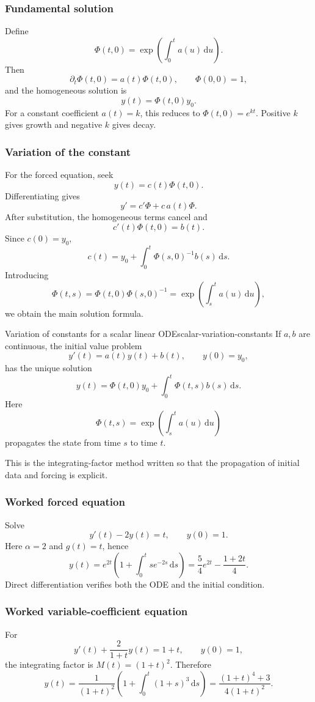 \documentclass[11pt]{article}
\newcommand{\dd}{\,\mathrm{d}}
\theoremstyle{definition}
\theoremstyle{plain}
\theoremstyle{remark}
\begin{document}
\subsubsection*{Fundamental solution}

Define
\[
\boxed{\Phi(t,0)=\exp\left(\int_0^t a(u)\dd u\right).}
\]
Then
\[
\partial_t\Phi(t,0)=a(t)\Phi(t,0),
\qquad \Phi(0,0)=1,
\]
and the homogeneous solution is
\[
\boxed{y(t)=\Phi(t,0)y_0.}
\]
For a constant coefficient $a(t)=k$, this reduces to
$\Phi(t,0)=e^{kt}$. Positive $k$ gives growth and negative $k$ gives decay.

\subsubsection*{Variation of the constant}

For the forced equation, seek
\[
y(t)=c(t)\Phi(t,0).
\]
Differentiating gives
\[
y'=c'\Phi+c\,a(t)\Phi.
\]
After substitution, the homogeneous terms cancel and
\[
c'(t)\Phi(t,0)=b(t).
\]
Since $c(0)=y_0$,
\[
c(t)=y_0+\int_0^t\Phi(s,0)^{-1}b(s)\dd s.
\]
Introducing
\[
\Phi(t,s)=\Phi(t,0)\Phi(s,0)^{-1}
=\exp\left(\int_s^t a(u)\dd u\right),
\]
we obtain the main solution formula.

\begin{keyproposition}{Variation of constants for a scalar linear ODE}{scalar-variation-constants}
If $a,b$ are continuous, the initial value problem
\[
y'(t)=a(t)y(t)+b(t),\qquad y(0)=y_0,
\]
has the unique solution
\[
\boxed{
y(t)=\Phi(t,0)y_0+\int_0^t\Phi(t,s)b(s)\dd s.}
\]
Here
\[
\boxed{\Phi(t,s)=\exp\left(\int_s^t a(u)\dd u\right)}
\]
propagates the state from time $s$ to time $t$.
\end{keyproposition}

This is the integrating-factor method written so that the propagation of
initial data and forcing is explicit.

\subsubsection*{Worked forced equation}
Solve
\[
y'(t)-2y(t)=t,
\qquad y(0)=1.
\]
Here $\alpha=2$ and $g(t)=t$, hence
\[
y(t)=e^{2t}\left(1+\int_0^tse^{-2s}\dd s\right)
=\frac54e^{2t}-\frac{1+2t}{4}.
\]
Direct differentiation verifies both the ODE and the initial condition.

\subsubsection*{Worked variable-coefficient equation}
For
\[
y'(t)+\frac{2}{1+t}y(t)=1+t,
\qquad y(0)=1,
\]
the integrating factor is $M(t)=(1+t)^2$. Therefore
\[
y(t)=\frac{1}{(1+t)^2}
\left(1+\int_0^t(1+s)^3\dd s\right)
=\frac{(1+t)^4+3}{4(1+t)^2}.
\]
\end{document}
